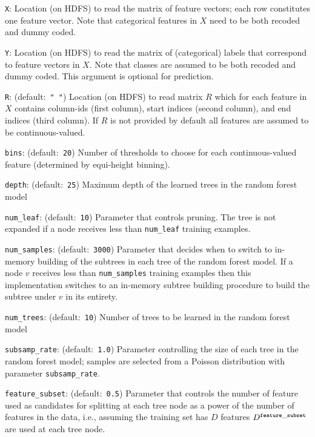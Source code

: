  
\begin{Description}
	\item[{\tt X}:]
	Location (on HDFS) to read the matrix of feature vectors; 
	each row constitutes one feature vector. Note that categorical features in $X$ need to be both recoded and dummy coded.
	\item[{\tt Y}:]
	Location (on HDFS) to read the matrix of (categorical) 
	labels that correspond to feature vectors in $X$. Note that classes are assumed to be both recoded and dummy coded. 
	This argument is optional for prediction. 
	\item[{\tt R}:] (default:\mbox{ }{\tt " "})
	Location (on HDFS) to read matrix $R$ which for each feature in $X$ contains column-ids (first column), start indices (second column), and end indices (third column).
	If $R$ is not provided by default all features are assumed to be continuous-valued.   
	\item[{\tt bins}:] (default:\mbox{ }{\tt 20})
	Number of thresholds to choose for each continuous-valued feature (determined by equi-height binning). 
	\item[{\tt depth}:] (default:\mbox{ }{\tt 25})
	Maximum depth of the learned trees in the random forest model
	\item[{\tt num\_leaf}:] (default:\mbox{ }{\tt 10})
	Parameter that controls pruning. The tree
	is not expanded if a node receives less than {\tt num\_leaf} training examples.
	\item[{\tt num\_samples}:] (default:\mbox{ }{\tt 3000})
	Parameter that decides when to switch to in-memory building of the subtrees in each tree of the random forest model. 
	If a node $v$ receives less than {\tt num\_samples}
	training examples then this implementation switches to an in-memory subtree
	building procedure to build the subtree under $v$ in its entirety.
	\item[{\tt num\_trees}:] (default:\mbox{ }{\tt 10})
	Number of trees to be learned in the random forest model
	\item[{\tt subsamp\_rate}:] (default:\mbox{ }{\tt 1.0})
	Parameter controlling the size of each tree in the random forest model; samples are selected from a Poisson distribution with parameter {\tt subsamp\_rate}.
	\item[{\tt feature\_subset}:] (default:\mbox{ }{\tt 0.5})
	Parameter that controls the number of feature used as candidates for splitting at each tree node as a power of the number of features in the data, i.e., assuming the training set has $D$ features $D^{\tt feature\_subset}$ are used at each tree node.

\end{Description}
